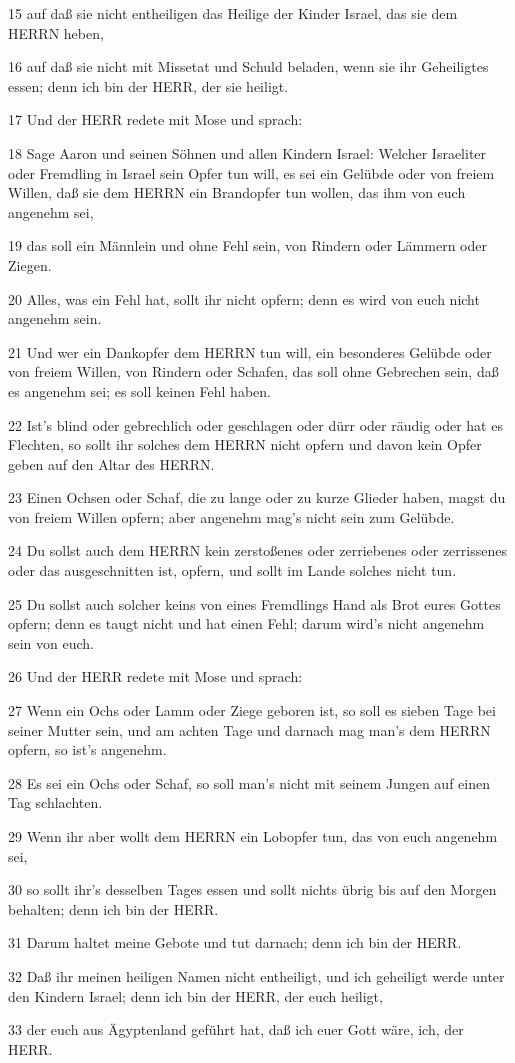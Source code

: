 \par 15 auf daß sie nicht entheiligen das Heilige der Kinder Israel, das sie dem HERRN heben,
\par 16 auf daß sie nicht mit Missetat und Schuld beladen, wenn sie ihr Geheiligtes essen; denn ich bin der HERR, der sie heiligt.
\par 17 Und der HERR redete mit Mose und sprach:
\par 18 Sage Aaron und seinen Söhnen und allen Kindern Israel: Welcher Israeliter oder Fremdling in Israel sein Opfer tun will, es sei ein Gelübde oder von freiem Willen, daß sie dem HERRN ein Brandopfer tun wollen, das ihm von euch angenehm sei,
\par 19 das soll ein Männlein und ohne Fehl sein, von Rindern oder Lämmern oder Ziegen.
\par 20 Alles, was ein Fehl hat, sollt ihr nicht opfern; denn es wird von euch nicht angenehm sein.
\par 21 Und wer ein Dankopfer dem HERRN tun will, ein besonderes Gelübde oder von freiem Willen, von Rindern oder Schafen, das soll ohne Gebrechen sein, daß es angenehm sei; es soll keinen Fehl haben.
\par 22 Ist's blind oder gebrechlich oder geschlagen oder dürr oder räudig oder hat es Flechten, so sollt ihr solches dem HERRN nicht opfern und davon kein Opfer geben auf den Altar des HERRN.
\par 23 Einen Ochsen oder Schaf, die zu lange oder zu kurze Glieder haben, magst du von freiem Willen opfern; aber angenehm mag's nicht sein zum Gelübde.
\par 24 Du sollst auch dem HERRN kein zerstoßenes oder zerriebenes oder zerrissenes oder das ausgeschnitten ist, opfern, und sollt im Lande solches nicht tun.
\par 25 Du sollst auch solcher keins von eines Fremdlings Hand als Brot eures Gottes opfern; denn es taugt nicht und hat einen Fehl; darum wird's nicht angenehm sein von euch.
\par 26 Und der HERR redete mit Mose und sprach:
\par 27 Wenn ein Ochs oder Lamm oder Ziege geboren ist, so soll es sieben Tage bei seiner Mutter sein, und am achten Tage und darnach mag man's dem HERRN opfern, so ist's angenehm.
\par 28 Es sei ein Ochs oder Schaf, so soll man's nicht mit seinem Jungen auf einen Tag schlachten.
\par 29 Wenn ihr aber wollt dem HERRN ein Lobopfer tun, das von euch angenehm sei,
\par 30 so sollt ihr's desselben Tages essen und sollt nichts übrig bis auf den Morgen behalten; denn ich bin der HERR.
\par 31 Darum haltet meine Gebote und tut darnach; denn ich bin der HERR.
\par 32 Daß ihr meinen heiligen Namen nicht entheiligt, und ich geheiligt werde unter den Kindern Israel; denn ich bin der HERR, der euch heiligt,
\par 33 der euch aus Ägyptenland geführt hat, daß ich euer Gott wäre, ich, der HERR.

